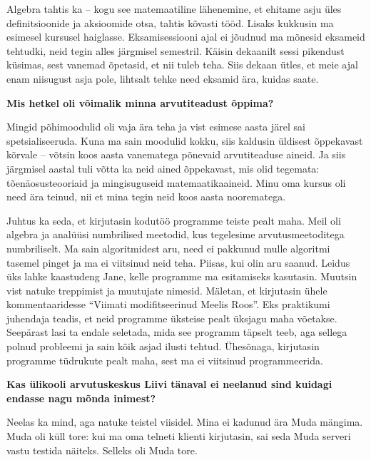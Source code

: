 Algebra tahtis ka -- kogu see matemaatiline lähenemine, et ehitame asju üles
definitsioonide ja aksioomide otsa, tahtis kõvasti tööd.
Lisaks kukkusin ma esimesel kursusel haiglasse. Eksamisessiooni ajal ei jõudnud
ma mõnesid eksameid tehtudki, neid tegin alles järgmisel semestril. Käisin
dekaanilt sessi pikendust küsimas, sest vanemad õpetasid, et nii tuleb teha.
Siis dekaan ütles, et meie ajal enam niisugust asja pole, lihtsalt tehke need
eksamid ära, kuidas saate.

\textbf{Mis hetkel oli võimalik minna arvutiteadust õppima?}

Mingid põhimoodulid oli vaja ära teha ja vist esimese aasta järel sai
spetsialiseeruda. Kuna ma sain moodulid kokku, siis kaldusin üldisest
õppekavast kõrvale -- võtsin koos aasta vanematega põnevaid
arvutiteaduse aineid. Ja siis järgmisel aastal tuli võtta ka neid ained õppekavast, mis olid tegemata: tõenäosusteooriaid ja mingisuguseid matemaatikaaineid.
Minu oma kursus oli need ära teinud, nii et mina tegin neid koos aasta
noorematega.

Juhtus ka seda, et kirjutasin kodutöö programme teiste pealt maha. Meil oli
algebra ja analüüsi numbrilised meetodid, kus tegelesime arvutusmeetoditega
numbriliselt. Ma sain algoritmidest aru, need ei pakkunud mulle
algoritmi tasemel pinget ja ma ei viitsinud neid teha. Piisas, kui olin aru
saanud. Leidus üks lahke kaastudeng Jane, kelle programme ma
esitamiseks kasutasin. Muutsin vist natuke treppimist ja muutujate nimesid.
Mäletan, et kirjutasin ühele kommentaaridesse \enquote{Viimati
modifitseerinud Meelis Roos}. Eks
praktikumi juhendaja teadis, et neid programme üksteise pealt üksjagu maha
võetakse. Seepärast lasi ta endale seletada, mida see programm täpselt
teeb, aga sellega polnud probleemi ja sain kõik asjad ilusti tehtud. Ühesõnaga, kirjutasin
programme tüdrukute pealt maha, sest ma ei viitsinud programmeerida.

\textbf{Kas ülikooli arvutuskeskus Liivi tänaval ei neelanud
sind kuidagi endasse nagu mõnda inimest?}

Neelas ka mind, aga natuke teistel viisidel. Mina ei kadunud ära
Muda mängima. Muda oli küll tore: kui ma oma telneti klienti kirjutasin,
sai seda Muda serveri vastu testida näiteks. Selleks oli Muda tore.

